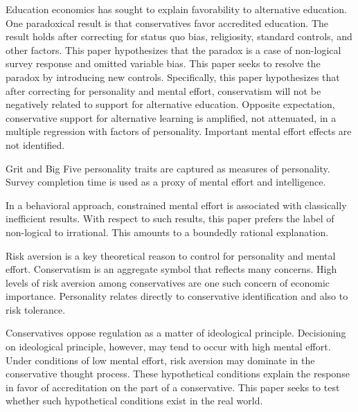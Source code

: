 \documentclass[review]{elsarticle}
\begin{document}
Education economics has sought to explain favorability to alternative education.
One paradoxical result is that conservatives favor accredited education\cite{vandivier2020preliminary}.
The result holds after correcting for status quo bias, religiosity, standard controls, and other factors.
This paper hypothesizes that the paradox is a case of non-logical survey response and omitted variable bias.
This paper seeks to resolve the paradox by introducing new controls.
Specifically, this paper hypothesizes that after correcting for personality and mental effort,
conservatism will not be negatively related to support for alternative education.
Opposite expectation,
conservative support for alternative learning is amplified,
not attenuated,
in a multiple regression with factors of personality.
Important mental effort effects are not identified.

Grit and Big Five personality traits are captured as measures of personality.
Survey completion time is used as a proxy of mental effort and intelligence.

In a behavioral approach, constrained mental effort is associated with classically inefficient results.
With respect to such results, this paper prefers the label of non-logical to irrational.
This amounts to a boundedly rational explanation\cite{candela2016vilfredo}.

Risk aversion is a key theoretical reason to control for personality and mental effort.
Conservatism is an aggregate symbol that reflects many concerns\cite{hill1997liberal}.
High levels of risk aversion among conservatives are one such concern of economic importance\cite{perhac1996does}.
Personality relates directly to conservative identification\cite{chirumbolo2010personality} and also to risk tolerance.

Conservatives oppose regulation as a matter of ideological principle\cite{teghtsoonian1993neo}.
Decisioning on ideological principle, however, may tend to occur with high mental effort.
Under conditions of low mental effort, risk aversion may dominate in the conservative thought process.
These hypothetical conditions explain the response in favor of accreditation on the part of a conservative.
This paper seeks to test whether such hypothetical conditions exist in the real world.
\end{document}
